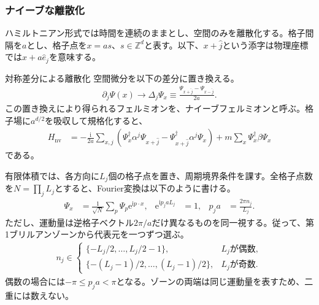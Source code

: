 \documentclass[a4paper,10.5pt]{article}
\numberwithin{equation}{section}
\providecommand{\ii}{\mathrm{i}}
\providecommand{\ee}{\mathrm{e}}
\providecommand{\nv}{\mathrm{nv}}
\begin{document}
\subsubsection{ナイーブな離散化}
ハミルトニアン形式では時間を連続のままとし、空間のみを離散化する。格子間隔を$a$とし、格子点を$x=as$、$s\in\mathbb Z^d$と表す。以下、$x+\hat j$という添字は物理座標では$x+a\hat e_j$を意味する。
\begin{defbox}{対称差分による離散化}
空間微分を以下の差分に置き換える。
\begin{align}
\partial_j\Psi(x)\longrightarrow
\Delta_j\Psi_x\equiv\frac{\Psi_{x+\hat j}-\Psi_{x-\hat j}}{2a}.
\end{align}
この置き換えにより得られるフェルミオンを、ナイーブフェルミオンと呼ぶ。格子場に$a^{d/2}$を吸収して規格化すると、
\begin{align}
H_{\nv}
&=-\frac{\ii}{2a}\sum_{x,j}
 \left(\Psi_x^\dagger\alpha^j\Psi_{x+\hat j}
       -\Psi_{x+\hat j}^\dagger\alpha^j\Psi_x\right)
 +m\sum_x\Psi_x^\dagger\beta\Psi_x
\label{eq:naive}
\end{align}
である。
\end{defbox}
有限体積では、各方向に$L_j$個の格子点を置き、周期境界条件を課す。全格子点数を$N=\prod_jL_j$とすると、Fourier変換は以下のように書ける。
\begin{align}
\Psi_x&=\frac{1}{\sqrt N}\sum_p\Psi_p\ee^{\ii p\cdot x},&
\ee^{\ii p_j aL_j}&=1,&
p_j a&=\frac{2\pi n_j}{L_j}.
\end{align}
ただし、運動量は逆格子ベクトル$2\pi/a$だけ異なるものを同一視する。従って、第1ブリルアンゾーンから代表元を一つずつ選ぶ。
\begin{align}
n_j\in
\begin{cases}
\{-L_j/2,\ldots,L_j/2-1\},&L_j\text{が偶数},\\
\{-(L_j-1)/2,\ldots,(L_j-1)/2\},&L_j\text{が奇数}.
\end{cases}
\end{align}
偶数の場合には$-\pi\leq p_ja<\pi$となる。ゾーンの両端は同じ運動量を表すため、二重には数えない。

\begin{center}
\end{center}
\end{document}
